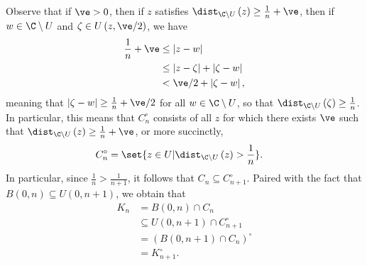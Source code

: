 \documentclass[10pt]{mypackage}
\begin{document}
\begin{solution}
\begin{enumerate}[(a)]
      Observe that if $\ve > 0$, then if $z$ satisfies $\dist_{\C\setminus U}\left( z \right) \geq \frac{1}{n} + \ve$, then if $w\in \C\setminus U$ and $\zeta\in U\left( z, \ve/2 \right)$, we have
      \begin{align*}
        \frac{1}{n} + \ve &\leq \left\vert z-w \right\vert\\
                          &\leq \left\vert z-\zeta \right\vert + \left\vert \zeta - w \right\vert\\
                          &< \ve/2 + \left\vert \zeta-w \right\vert,
      \end{align*}
      meaning that $\left\vert \zeta - w \right\vert \geq \frac{1}{n} + \ve/2$ for all $w\in \C\setminus U$, so that $\dist_{\C\setminus U}\left( \zeta \right) \geq \frac{1}{n}$. In particular, this means that $C_n^{\circ}$ consists of all $z$ for which there exists $\ve$ such that $\dist_{\C\setminus U}\left( z \right) \geq \frac{1}{n} + \ve$, or more succinctly,
      \begin{align*}
        C_n^{\circ} &= \set{z\in U | \dist_{\C\setminus U}\left( z \right) > \frac{1}{n}}.
      \end{align*}
      In particular, since $ \frac{1}{n} > \frac{1}{n + 1} $, it follows that $C_n\subseteq C_{n+1}^{\circ}$. Paired with the fact that $B\left( 0,n \right)\subseteq U\left( 0,n+1 \right)$, we obtain that
      \begin{align*}
        K_n &= B\left( 0,n \right) \cap C_n\\
            &\subseteq U\left( 0,n+1 \right)\cap C_{n+1}^{\circ}\\
            &= \left( B\left( 0,n+1 \right)\cap C_n \right)^{\circ}\\
            &= K_{n+1}^{\circ}.
      \end{align*}
  \end{enumerate}
\end{solution}
\end{document}
